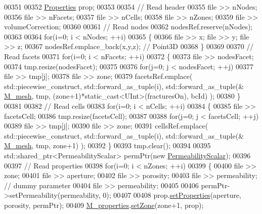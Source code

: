 \begin{DoxyCode}
00351 
00352     \hyperlink{classFVCode3D_1_1Properties}{Properties} prop;
00353 
00354     \textcolor{comment}{// Read header}
00355     file >> nNodes;
00356     file >> nFacets;
00357     file >> nCells;
00358     file >> nZones;
00359     file >> volumeCorrection;
00360 
00361     \textcolor{comment}{// Read nodes}
00362     nodesRef.reserve(nNodes);
00363 
00364     \textcolor{keywordflow}{for}(i=0; i < nNodes; ++i)
00365     \{
00366         file >> x; file >> y; file >> z;
00367         nodesRef.emplace\_back(x,y,z); \textcolor{comment}{// Point3D}
00368     \}
00369 
00370     \textcolor{comment}{// Read facets}
00371     \textcolor{keywordflow}{for}(i=0; i < nFacets; ++i)
00372     \{
00373         file >> nodesFacet;
00374         tmp.resize(nodesFacet);
00375 
00376         \textcolor{keywordflow}{for}(j=0; j < nodesFacet; ++j)
00377             file >> tmp[j];
00378         file >> zone;
00379         facetsRef.emplace( std::piecewise\_construct, std::forward\_as\_tuple(i), std::forward\_as\_tuple(&
      \hyperlink{classFVCode3D_1_1Importer_a6f1542d6c6ac192e36c8eec7dc366653}{M\_mesh}, tmp, (zone+1)*static\_cast<UInt>(fracturesOn), bcId) );
00380     \}
00381 
00382     \textcolor{comment}{// Read cells}
00383     \textcolor{keywordflow}{for}(i=0; i < nCells; ++i)
00384     \{
00385         file >> facetsCell;
00386         tmp.resize(facetsCell);
00387 
00388         \textcolor{keywordflow}{for}(j=0; j < facetsCell; ++j)
00389             file >> tmp[j];
00390         file >> zone;
00391         cellsRef.emplace( std::piecewise\_construct, std::forward\_as\_tuple(i), std::forward\_as\_tuple(&
      \hyperlink{classFVCode3D_1_1Importer_a6f1542d6c6ac192e36c8eec7dc366653}{M\_mesh}, tmp, zone+1) );
00392     \}
00393     tmp.clear();
00394 
00395     std::shared\_ptr<PermeabilityScalar> permPtr(\textcolor{keyword}{new} \hyperlink{classFVCode3D_1_1PermeabilityScalar}{PermeabilityScalar});
00396 
00397     \textcolor{comment}{// Read properties}
00398     \textcolor{keywordflow}{for}(i=0; i < nZones; ++i)
00399     \{
00400         file >> zone;
00401         file >> aperture;
00402         file >> porosity;
00403         file >> permeability; \textcolor{comment}{// dummy parameter}
00404         file >> permeability;
00405 
00406         permPtr->setPermeability(permeability, 0);
00407 
00408         prop.\hyperlink{classFVCode3D_1_1Properties_a0ddb477254cfacdb96a440ddedc2548c}{setProperties}(aperture, porosity, permPtr);
00409         \hyperlink{classFVCode3D_1_1Importer_af678e18e971d5a132f5ba494981f6dae}{M\_properties}.\hyperlink{classFVCode3D_1_1PropertiesMap_ac303adadd1101e7bee62ecad0e8ea6ac}{setZone}(zone+1, prop);

\end{DoxyCode}
